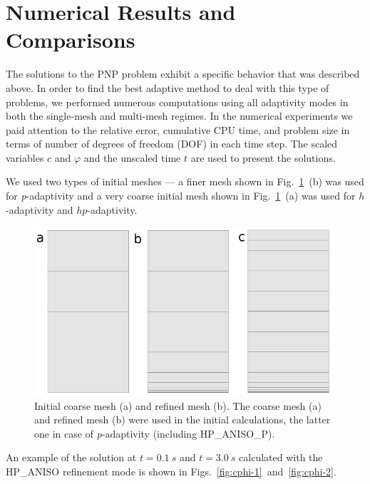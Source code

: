 \section{Numerical Results and Comparisons}\label{sec:results}


The solutions to the PNP problem exhibit a specific behavior that was 
described above. In order to find the best adaptive method to deal with 
this type of problems, we performed numerous computations using all 
adaptivity modes in both the single-mesh and multi-mesh regimes.
In the numerical experiments we paid attention to the 
relative error, cumulative CPU time, and problem size 
in terms of number of degrees of freedom (DOF) in each 
time step. The scaled variables $c$
and $\varphi$ and the unscaled time $t$ are used to present the solutions.

We used two types of initial meshes --- a finer mesh shown 
in Fig.~\ref{fig:mesh}~(b) was used for \emph{p}-adaptivity
and a very coarse initial mesh shown in  Fig.~\ref{fig:mesh}~(a) was 
used for $h$-adaptivity and $hp$-adaptivity.

\begin{figure}[!ht]
  \begin{centering}
  \includegraphics[width=.6\columnwidth]{mesh}
  \caption{\label{fig:mesh} Initial coarse mesh (a)
  	and refined mesh (b). The coarse mesh (a)
	and refined mesh (b) were used in the initial calculations, the latter one
	in case of \emph{p}-adaptivity (including HP\_ANISO\_P).}
  \end{centering}
\end{figure}

An example of the solution at $t=0.1\ s$ and $t=3.0\ s$ 
calculated with the HP\_ANISO refinement mode is shown
in Figs.~\ref{fig:cphi-1}~and~\ref{fig:cphi-2}. 

